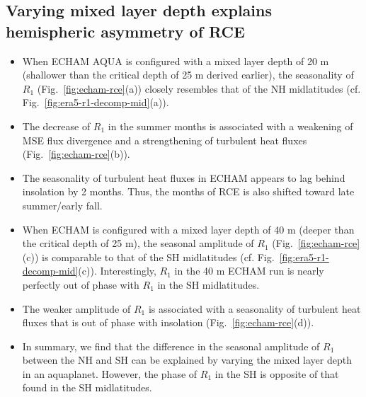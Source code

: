 \documentclass{ametsocV5}
\begin{document}
\subsection{Varying mixed layer depth explains hemispheric asymmetry of RCE}
\begin{itemize}
  \item When ECHAM AQUA is configured with a mixed layer depth of 20 m (shallower than the critical depth of 25 m derived earlier), the seasonality of \(R_{1}\) (Fig.~\ref{fig:echam-rce}(a)) closely resembles that of the NH midlatitudes (cf. Fig.~\ref{fig:era5-r1-decomp-mid}(a)).
  \item The decrease of \(R_{1}\) in the summer months is associated with a weakening of MSE flux divergence and a strengthening of turbulent heat fluxes (Fig.~\ref{fig:echam-rce}(b)).
  \item The seasonality of turbulent heat fluxes in ECHAM appears to lag behind insolation by 2 months. Thus, the months of RCE is also shifted toward late summer/early fall.
  \item When ECHAM is configured with a mixed layer depth of 40 m (deeper than the critical depth of 25 m), the seasonal amplitude of \(R_{1}\) (Fig.~\ref{fig:echam-rce}(c)) is comparable to that of the SH midlatitudes (cf. Fig.~\ref{fig:era5-r1-decomp-mid}(c)). Interestingly, \(R_{1}\) in the 40 m ECHAM run is nearly perfectly out of phase with \(R_{1}\) in the SH midlatitudes.
  \item The weaker amplitude of \(R_{1}\) is associated with a seasonality of turbulent heat fluxes that is out of phase with insolation (Fig.~\ref{fig:echam-rce}(d)).
  \item In summary, we find that the difference in the seasonal amplitude of \(R_{1}\) between the NH and SH can be explained by varying the mixed layer depth in an aquaplanet. However, the phase of \(R_{1}\) in the SH is opposite of that found in the SH midlatitudes.
\end{itemize}
\end{document}
